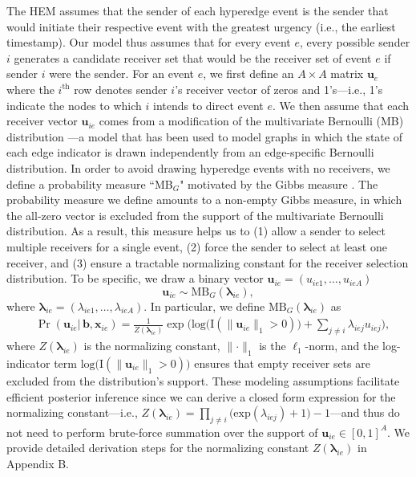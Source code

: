 \documentclass[ba]{imsart}
\numberwithin{equation}{section}
\theoremstyle{plain}
\begin{document}
	The HEM assumes that the sender of each hyperedge event is the sender that would initiate their respective event with the greatest urgency (i.e., the earliest timestamp). Our model thus assumes that for every event $e$, every possible sender $i$ generates a candidate receiver set that would be the receiver set of event $e$ if sender $i$ were the sender. For an event $e$, we first define an $A\times A$ matrix $\boldsymbol{u}_e$ where the $i^{\textrm{th}}$ row denotes sender $i$'s receiver vector of zeros and 1's---i.e., 1's indicate the nodes to which $i$ intends to direct event $e$. We then assume that each receiver vector $\boldsymbol{u}_{ie}$ comes from a modification of the multivariate Bernoulli (MB) distribution \citep{dai2013multivariate}---a model that has been used to model graphs in which the state of each edge indicator is drawn independently from an edge-specific Bernoulli distribution. In order to avoid drawing hyperedge events with no receivers, we define a probability measure ``MB$_{G}$" motivated by the Gibbs measure \citep{fellows2017removing}. The probability measure we define amounts to a non-empty Gibbs measure, in which the all-zero vector is excluded from the support of the multivariate Bernoulli distribution. As a result, this measure helps us to (1) allow a sender to select multiple receivers for a single event, (2) force the sender to select at least one receiver, and (3) ensure a tractable normalizing constant for the receiver selection distribution. To be specific, we draw a binary vector $\boldsymbol{u}_{ie}= (u_{ie1},
	\ldots, u_{ieA})$ 
	\begin{equation} \boldsymbol{u}_{ie}  \sim
		\mbox{MB}_{G}(\boldsymbol{\lambda}_{ie}),
	\end{equation}
	where $\boldsymbol{\lambda}_{ie}= (\lambda_{ie1},
	\ldots, \lambda_{ieA})$. In particular, we define $\mbox{MB}_{G}(\boldsymbol{\lambda}_{ie})$ as
	\begin{equation}
		\begin{aligned}
			&\Pr(\boldsymbol{u}_{ie}|\,\boldsymbol{b}, \boldsymbol{x}_{ie}) = \frac{1}{Z(\boldsymbol{\lambda}_{ie})}\exp\Big(\mbox{log}\big(\text{I}( \lVert \boldsymbol{u}_{ie}\rVert_1 > 0 )\big) + \sum_{j\neq i} \lambda_{iej}u_{iej}\Big) ,
		\end{aligned}
		\label{eqn:Gibbs}
	\end{equation}
	where $Z(\boldsymbol{\lambda}_{ie})$ is the normalizing constant, $\lVert \cdot \rVert_1$ is the $\ell_1$-norm, and the log-indicator term $\mbox{log}\big(\text{I}( \lVert \boldsymbol{u}_{ie}\rVert_1 > 0 )\big)$ ensures that empty receiver sets are excluded from the distribution's support. These modeling assumptions facilitate efficient posterior inference since we can derive a closed form expression for the normalizing constant---i.e., $Z(\boldsymbol{\lambda}_{ie})= \prod_{j\neq i} \big(\mbox{exp}(\lambda_{iej}) + 1\big)-1$---and thus do not need to perform brute-force summation over the support of $\boldsymbol{u}_{ie} \in [0,1]^A$. We provide detailed derivation steps for the normalizing constant $Z(\boldsymbol{\lambda}_{ie})$ in Appendix B. 
\end{document}
